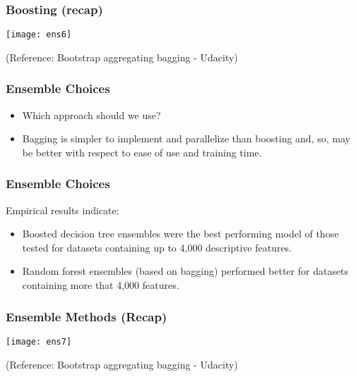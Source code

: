 \begin{frame}[fragile]\frametitle{Boosting (recap)}

\begin{center}
\texttt{[image: ens6]}
\end{center}
\tiny{(Reference: Bootstrap aggregating bagging - Udacity)}
\end{frame}


%



\begin{frame}[fragile]\frametitle{Ensemble Choices}
\begin{itemize}
\item Which approach should we use? 
\item Bagging is simpler to implement and parallelize than boosting and, so, may be better with respect to ease of use and training time.
\end{itemize}
\end{frame}


\begin{frame}[fragile]\frametitle{Ensemble Choices}
Empirical results indicate: 
\begin{itemize}
\item Boosted decision tree ensembles were the best performing model of those tested for datasets containing up to 4,000 descriptive features.
\item Random forest ensembles (based on bagging) performed better for datasets containing more that 4,000 features. 
\end{itemize}

\end{frame}



\begin{frame}[fragile]\frametitle{Ensemble Methods (Recap)}

\begin{center}
\texttt{[image: ens7]}
\end{center}
\tiny{(Reference: Bootstrap aggregating bagging - Udacity)}
\end{frame}


